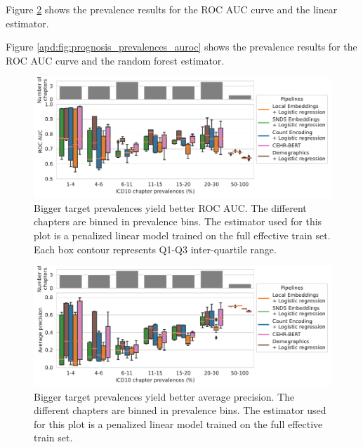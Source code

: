 \documentclass[french,12pt,twoside,a4paper]{book}
\begin{document}
\begin{appendices}
  Figure \ref{apd:fig:prognosis_prevalences_auroc_linear} shows the prevalence
  results for the ROC AUC curve and the linear estimator.

  Figure \ref{apd:fig:prognosis_prevalences_auroc} shows the prevalence results
  for the ROC AUC curve and the random forest estimator.



  \begin{figure}[!h]
    \centering
    \includegraphics[width=0.8\linewidth]{img/chapter_3/prognosis/prevalence_results__est_ridge_boxplot_roc_auc_score_xlog.pdf}
    \caption{Bigger target prevalences yield better ROC AUC. The different
      chapters are binned in prevalence bins. The estimator used for this plot is
      a penalized linear model trained on the full effective train set. Each box
      contour represents Q1-Q3 inter-quartile range.}%
    \label{apd:fig:prognosis_prevalences_auprc_linear}
  \end{figure}


  \begin{figure}[!h]
    \centering
    \includegraphics[width=0.8\linewidth]{img/chapter_3/prognosis/prevalence_results__est_ridge_boxplot_average_precision_score_xlog.pdf}
    \caption{ Bigger target prevalences yield better average precision. The different
      chapters are binned in prevalence bins. The estimator used for this plot
      is a penalized linear model trained on the full effective train set.}%
    \label{apd:fig:prognosis_prevalences_auroc_linear}
  \end{figure}



\end{appendices}
\end{document}
